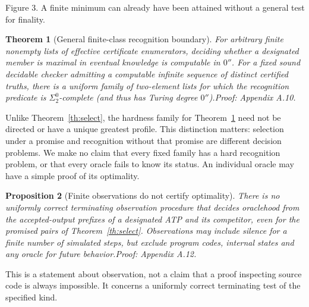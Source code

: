 \documentclass[11pt]{article}
\newtheorem{theorem}{Theorem}[section]
\newtheorem{proposition}[theorem]{Proposition}
\newcommand{\pf}[1]{\unskip\hspace{.6em plus 1fill}\textit{Proof: Appendix A.#1.}}
\begin{document}
\begin{center}

\small Figure 3. A finite minimum can already have been attained without a general test for finality.
\end{center}
\begin{theorem}[General finite-class recognition boundary]\label{th:recognize}
For arbitrary finite nonempty lists of effective certificate enumerators, deciding whether a designated member is maximal in eventual knowledge is computable in $0''$. For a fixed sound decidable checker admitting a computable infinite sequence of distinct certified truths, there is a uniform family of two-element lists for which the recognition predicate is $\Sigma^0_2$-complete (and thus has Turing degree $0''$).\pf{10}
\end{theorem}
Unlike Theorem~\ref{th:select}, the hardness family for Theorem~\ref{th:recognize} need not be directed or have a unique greatest profile. This distinction matters: selection under a promise and recognition without that promise are different decision problems. We make no claim that every fixed family has a hard recognition problem, or that every oracle fails to know its status. An individual oracle may have a simple proof of its optimality.

\begin{proposition}[Finite observations do not certify optimality]\label{th:finiteobs}
There is no uniformly correct terminating observation procedure that decides oraclehood from the accepted-output prefixes of a designated ATP and its competitor, even for the promised pairs of Theorem~\ref{th:select}. Observations may include silence for a finite number of simulated steps, but exclude program codes, internal states and any oracle for future behavior.\pf{12}
\end{proposition}
This is a statement about observation, not a claim that a proof inspecting source code is always impossible. It concerns a uniformly correct terminating test of the specified kind.
\end{document}
